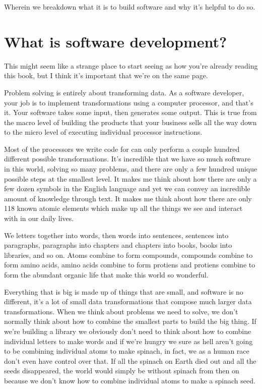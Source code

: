 \documentclass[]{book}
\begin{document}
Wherein we breakdown what it is to build software and why it's helpful
to do so.

\chapter{What is software
development?}\label{what-is-software-development}

This might seem like a strange place to start seeing as how you're
already reading this book, but I think it's important that we're on the
same page.

Problem solving is entirely about transforming data. As a software
developer, your job is to implement transformations using a computer
processor, and that's it. Your software takes some input, then generates
some output. This is true from the macro level of building the products
that your business sells all the way down to the micro level of
executing individual processor instructions.

Most of the processors we write code for can only perform a couple
hundred different possible transformations. It's incredible that we have
so much software in this world, solving so many problems, and there are
only a few hundred unique possible steps at the smallest level. It makes
me think about how there are only a few dozen symbols in the English
language and yet we can convey an incredible amount of knowledge through
text. It makes me think about how there are only 118 known atomic
elements which make up all the things we see and interact with in our
daily lives.

We letters together into words, then words into sentences, sentences
into paragraphs, paragraphs into chapters and chapters into books, books
into libraries, and so on. Atoms combine to form compounds, compounds
combine to form amino acids, amino acids combine to form protiens and
protiens combine to form the abundant organic life that make this world
so wonderful.

Everything that is big is made up of things that are small, and software
is no different, it's a lot of small data transformations that compose
much larger data transformations. When we think about problems we need
to solve, we don't normally think about how to combine the smallest
parts to build the big thing. If we're building a library we obviously
don't need to think about how to combine individual letters to make
words and if we're hungry we sure as hell aren't going to be combining
individual atoms to make spinach, in fact, we as a human race don't even
have control over that. If all the spinach on Earth died out and all the
seeds disappeared, the world would simply be without spinach from then
on because we don't know how to combine individual atoms to make a
spinach seed.
\end{document}
